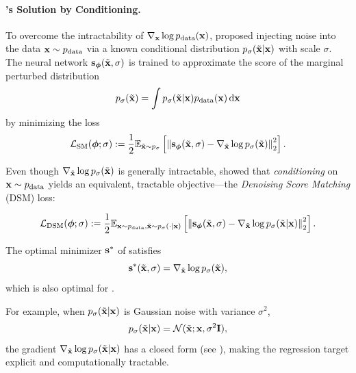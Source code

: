 \paragraph{\citet{vincent2011connection}'s Solution by Conditioning.}
To overcome the intractability of $\nabla_{{\mathbf{x}}} \log p_{\text{data}}({\mathbf{x}})$, \citet{vincent2011connection} proposed injecting noise into the data ${\mathbf{x}} \sim p_{\text{data}}$ via a known conditional distribution $p_{\sigma}(\tilde{{\mathbf{x}}}|{\mathbf{x}})$ with scale $\sigma$. The neural network ${\mathbf{s}}_{\bm{\phi}}(\tilde{{\mathbf{x}}}, \sigma)$ is trained to approximate the score of the marginal perturbed distribution
\[
p_\sigma(\tilde{{\mathbf{x}}}) = \int p_{\sigma}(\tilde{{\mathbf{x}}}|{\mathbf{x}}) p_{\text{data}}({\mathbf{x}}) \mathop{}\!\mathrm{d} {\mathbf{x}}
\]
by minimizing the loss
\begin{align}\label{eq:sm-noise-loss}
\mathcal{L}_{\text{SM}}(\bm{\phi}; \sigma) := \frac{1}{2} \mathbb{E}_{\tilde{{\mathbf{x}}} \sim p_\sigma} \left[ \left\lVert{\mathbf{s}}_{\bm{\phi}}(\tilde{{\mathbf{x}}}, \sigma) - \nabla_{\tilde{{\mathbf{x}}}} \log p_\sigma(\tilde{{\mathbf{x}}})\right\rVert_2^2 \right].
\end{align}

Even though $\nabla_{\tilde{{\mathbf{x}}}} \log p_\sigma(\tilde{{\mathbf{x}}})$ is generally intractable, \citet{vincent2011connection} showed that \emph{conditioning} on ${\mathbf{x}} \sim p_{\text{data}}$ yields an equivalent, tractable objective—the \emph{Denoising Score Matching} (DSM) loss:
\begin{mdframed}
\begin{align}\label{eq:dsm-loss}
\mathcal{L}_{\text{DSM}}(\bm{\phi}; \sigma) := \frac{1}{2} \mathbb{E}_{{\mathbf{x}} \sim p_{\text{data}}, \tilde{{\mathbf{x}}} \sim p_{\sigma}(\cdot|{\mathbf{x}})} \left[ \left\lVert{\mathbf{s}}_{\bm{\phi}}(\tilde{{\mathbf{x}}}, \sigma) - \nabla_{\tilde{{\mathbf{x}}}} \log p_{\sigma}(\tilde{{\mathbf{x}}}|{\mathbf{x}})\right\rVert_2^2 \right].
\end{align}
\end{mdframed}

The optimal minimizer ${\mathbf{s}}^*$ of  satisfies
\[
{\mathbf{s}}^*(\tilde{{\mathbf{x}}}, \sigma) = \nabla_{\tilde{{\mathbf{x}}}} \log p_\sigma(\tilde{{\mathbf{x}}}),
\]
which is also optimal for .

For example, when $p_{\sigma}(\tilde{{\mathbf{x}}}|{\mathbf{x}})$ is Gaussian noise with variance $\sigma^2$,
\[
p_{\sigma}(\tilde{{\mathbf{x}}}|{\mathbf{x}}) = \mathcal{N}(\tilde{{\mathbf{x}}}; {\mathbf{x}}, \sigma^2 \mathbf{I}),
\]
the gradient $\nabla_{\tilde{{\mathbf{x}}}} \log p_{\sigma}(\tilde{{\mathbf{x}}}|{\mathbf{x}})$ has a closed form (see ), making the regression target explicit and computationally tractable.

